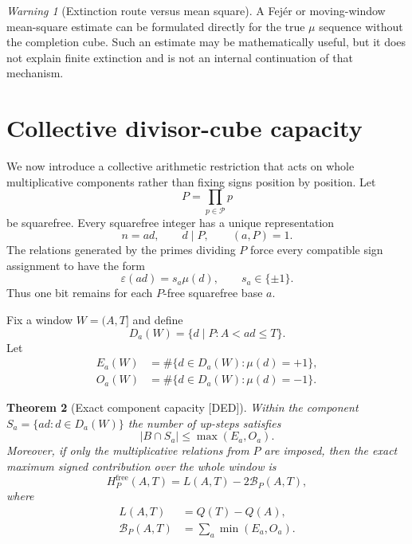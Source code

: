 \documentclass[11pt]{amsart}
\numberwithin{equation}{section}
\theoremstyle{plain}
\newtheorem{theorem}{Theorem}[section]
\theoremstyle{definition}
\theoremstyle{remark}
\newtheorem{warning}[theorem]{Warning}
\newcommand{\Mob}{\mu}
\newcommand{\Sq}{Q}
\newcommand{\DED}{\textup{[DED]}}
\begin{document}
\begin{warning}[Extinction route versus mean square]
\label{warn:extinction-nonroute}
A Fej\'er or moving-window mean-square estimate can be formulated directly for the true $\Mob$ sequence without the
completion cube.  Such an estimate may be mathematically useful, but it does not explain finite extinction and is not
an internal continuation of that mechanism.
\end{warning}

\section{Collective divisor-cube capacity}
\label{sec:divisor-capacity}

We now introduce a collective arithmetic restriction that acts on whole multiplicative components rather than fixing
signs position by position.  Let
\begin{equation}
P=\prod_{p\in\mathcal P}p
\label{eq:finite-prime-product}
\end{equation}
be squarefree.  Every squarefree integer has a unique representation
\begin{equation}
n=ad,\qquad d\mid P,\qquad (a,P)=1.
\label{eq:component-factorization}
\end{equation}
The relations generated by the primes dividing $P$ force every compatible sign assignment to have the form
\begin{equation}
\varepsilon(ad)=s_a\Mob(d),\qquad s_a\in\{\pm1\}.
\label{eq:component-signs}
\end{equation}
Thus one bit remains for each $P$-free squarefree base $a$.

Fix a window $W=(A,T]$ and define
\begin{equation}
D_a(W)=\{d\mid P:A<ad\le T\}.
\label{eq:active-divisors}
\end{equation}
Let
\begin{align}
E_a(W)&=\#\{d\in D_a(W):\Mob(d)=+1\},
\label{eq:even-parity-count}\\
O_a(W)&=\#\{d\in D_a(W):\Mob(d)=-1\}.
\label{eq:odd-parity-count}
\end{align}

\begin{theorem}[Exact component capacity \DED]
\label{thm:component-capacity}
Within the component $S_a=\{ad:d\in D_a(W)\}$ the number of up-steps satisfies
\begin{equation}
|B\cap S_a|\le\max(E_a,O_a).
\label{eq:component-up-capacity}
\end{equation}
Moreover, if only the multiplicative relations from $P$ are imposed, then the exact maximum signed contribution over
the whole window is
\begin{equation}
H_P^{\mathrm{free}}(A,T)
=
L(A,T)-2\mathcal B_P(A,T),
\label{eq:component-exact-height}
\end{equation}
where
\begin{align}
L(A,T)&=\Sq(T)-\Sq(A),
\label{eq:window-squarefree-length}\\
\mathcal B_P(A,T)&=\sum_a\min(E_a,O_a).
\label{eq:capacity-deficit}
\end{align}
\end{theorem}
\end{document}
